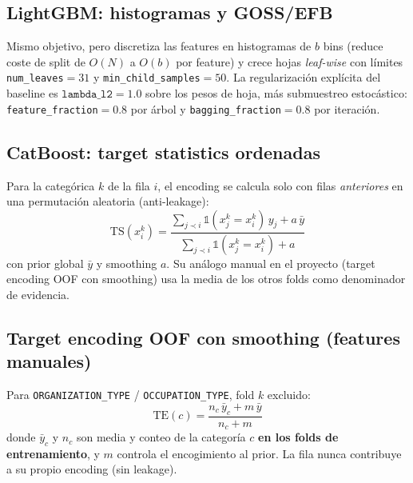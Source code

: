 \documentclass[11pt,a4paper]{article}
\begin{document}
\subsection{LightGBM: histogramas y GOSS/EFB}
Mismo objetivo, pero discretiza las features en histogramas de $b$ bins
(reduce coste de split de $O(N)$ a $O(b)$ por feature) y crece hojas
\emph{leaf-wise} con l\'imites \texttt{num\_leaves}$=31$ y
\texttt{min\_child\_samples}$=50$. La regularizaci\'on expl\'icita del
baseline es $\texttt{lambda\_l2} = 1.0$ sobre los pesos de hoja, m\'as
submuestreo estoc\'astico: \texttt{feature\_fraction}$=0.8$ por \'arbol y
\texttt{bagging\_fraction}$=0.8$ por iteraci\'on.

\subsection{CatBoost: target statistics ordenadas}
Para la categ\'orica $k$ de la fila $i$, el encoding se calcula solo con filas
\emph{anteriores} en una permutaci\'on aleatoria (anti-leakage):
\begin{equation}
\mathrm{TS}(x_i^{k}) = \frac{\sum_{j \prec i} \mathbb{1}(x_j^{k} = x_i^{k})\, y_j + a\, \bar{y}}
{\sum_{j \prec i} \mathbb{1}(x_j^{k} = x_i^{k}) + a}
\end{equation}
con prior global $\bar{y}$ y smoothing $a$. Su an\'alogo manual en el proyecto
(target encoding OOF con smoothing) usa la media de los otros folds como
denominador de evidencia.

\subsection{Target encoding OOF con smoothing (features manuales)}
Para \texttt{ORGANIZATION\_TYPE} / \texttt{OCCUPATION\_TYPE}, fold $k$ excluido:
\begin{equation}
\mathrm{TE}(c) = \frac{n_c\, \bar{y}_c + m\, \bar{y}}{n_c + m}
\end{equation}
donde $\bar{y}_c$ y $n_c$ son media y conteo de la categor\'ia $c$ \textbf{en
los folds de entrenamiento}, y $m$ controla el encogimiento al prior. La fila
nunca contribuye a su propio encoding (sin leakage).
\end{document}
